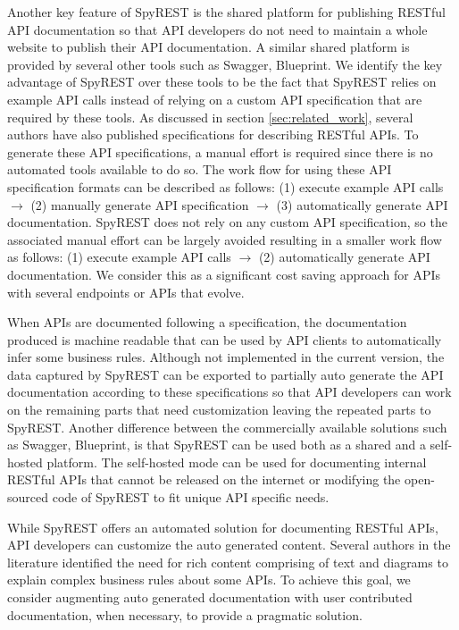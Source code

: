 \documentclass[conference]{IEEEtran}
\begin{document}
Another key feature of SpyREST is the shared platform for publishing RESTful API documentation so that API developers do not need to maintain a whole website to publish their API documentation. A similar shared platform is provided by several other tools such as Swagger, Blueprint. We identify the key advantage of SpyREST over these tools to be the fact that SpyREST relies on example API calls instead of relying on a custom API specification that are required by these tools. As discussed in section \ref{sec:related_work}, several authors have also published specifications for describing RESTful APIs. To generate these API specifications, a manual effort is required since there is no automated tools available to do so. The work flow for using these API specification formats can be described as follows: (1) execute example API calls $\longrightarrow$ (2) manually generate API specification $\longrightarrow$ (3) automatically generate API documentation. SpyREST does not rely on any custom API specification, so the associated manual effort can be largely avoided resulting in a smaller work flow as follows: (1) execute example API calls $\longrightarrow$ (2) automatically generate API documentation. We consider this as a significant cost saving approach for APIs with several endpoints or APIs that evolve.

When APIs are documented following a specification, the documentation produced is machine readable that can be used by API clients to automatically infer some business rules. Although not implemented in the current version, the data captured by SpyREST can be exported to partially auto generate the API documentation according to these specifications so that API developers can work on the remaining parts that need customization leaving the repeated parts to SpyREST. Another difference between the commercially available solutions such as Swagger, Blueprint, is that SpyREST can be used both as a shared and a self-hosted platform. The self-hosted mode can be used for documenting internal RESTful APIs that cannot be released on the internet or modifying the open-sourced code of SpyREST to fit unique API specific needs.

While SpyREST offers an automated solution for documenting RESTful APIs, API developers can customize the auto generated content. Several authors in the literature identified the need for rich content comprising of text and diagrams to explain complex business rules about some APIs. To achieve this goal, we consider augmenting auto generated documentation with user contributed documentation, when necessary, to provide a pragmatic solution.
\end{document}
